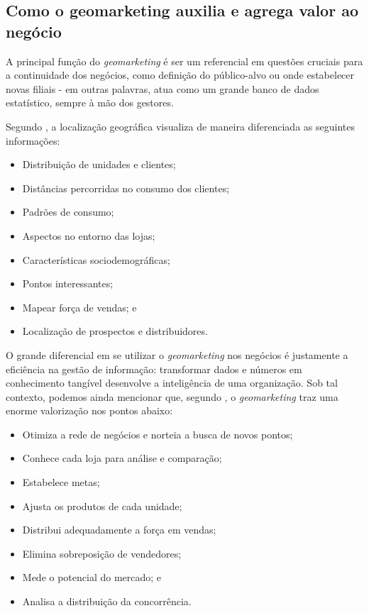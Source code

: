 \subsection{Como o geomarketing auxilia e agrega valor ao negócio}
\label{importancia}
A principal função do \emph{geomarketing} é ser um referencial em questões cruciais para a continuidade dos negócios, como definição do público-alvo ou onde estabelecer novas filiais - em outras palavras, atua como um grande banco de dados estatístico, sempre à mão dos gestores. 

Segundo , a localização geográfica visualiza de maneira diferenciada as seguintes informações:

\begin{itemize}
  \item Distribuição de unidades e clientes;
  \item Distâncias percorridas no consumo dos clientes;
  \item Padrões de consumo;
  \item Aspectos no entorno das lojas;
  \item Características sociodemográficas;
  \item Pontos interessantes;
  \item Mapear força de vendas; e
  \item Localização de prospectos e distribuidores.
\end{itemize}

O grande diferencial em se utilizar o \emph{geomarketing} nos negócios é justamente a eficiência na gestão de informação: transformar dados e números em conhecimento tangível desenvolve a inteligência de uma organização. Sob tal contexto, podemos ainda mencionar que, segundo , o \emph{geomarketing} traz uma enorme valorização nos pontos abaixo:

\begin{itemize}
  \item Otimiza a rede de negócios e norteia a busca de novos pontos;
  \item Conhece cada loja para análise e comparação;
  \item Estabelece metas;
  \item Ajusta os produtos de cada unidade;
  \item Distribui adequadamente a força em vendas;
  \item Elimina sobreposição de vendedores;
  \item Mede o potencial do mercado; e
  \item Analisa a distribuição da concorrência.
\end{itemize}

